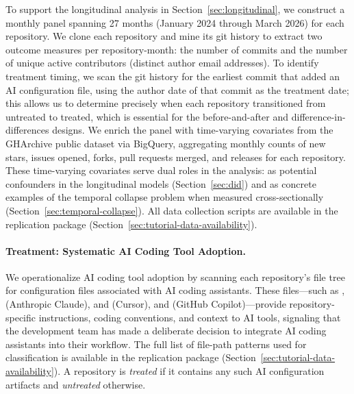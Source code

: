 To support the longitudinal analysis in Section~\ref{sec:longitudinal}, we construct a monthly panel spanning 27 months (January 2024 through March 2026) for each repository.
We clone each repository and mine its git history to extract two outcome measures per repository-month: the number of commits and the number of unique active contributors (distinct author email addresses).
To identify treatment timing, we scan the git history for the earliest commit that added an AI configuration file, using the author date of that commit as the treatment date; this allows us to determine precisely when each repository transitioned from untreated to treated, which is essential for the before-and-after and difference-in-differences designs.
We enrich the panel with time-varying covariates from the GHArchive public dataset via BigQuery, aggregating monthly counts of new stars, issues opened, forks, pull requests merged, and releases for each repository.
These time-varying covariates serve dual roles in the analysis: as potential confounders in the longitudinal models (Section~\ref{sec:did}) and as concrete examples of the temporal collapse problem when measured cross-sectionally (Section~\ref{sec:temporal-collapse}).
All data collection scripts are available in the replication package (Section~\ref{sec:tutorial-data-availability}).

\paragraph{Treatment: Systematic AI Coding Tool Adoption.}
We operationalize AI coding tool adoption by scanning each repository's file tree for configuration files associated with AI coding assistants.
These files---such as ,   (Anthropic Claude),  and  (Cursor), and  (GitHub Copilot)---provide repository-specific instructions, coding conventions, and context to AI tools, signaling that the development team has made a deliberate decision to integrate AI coding assistants into their workflow.
The full list of file-path patterns used for classification is available in the replication package (Section~\ref{sec:tutorial-data-availability}).
A repository is \emph{treated} if it contains any such AI configuration artifacts and \emph{untreated} otherwise.

